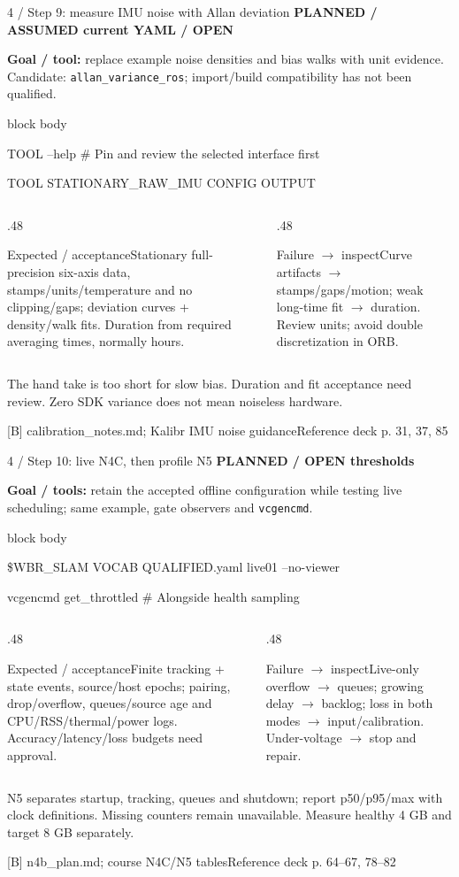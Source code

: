 \documentclass[aspectratio=169,12pt,t]{beamer}
\newcommand{\evidence}[1]{{\small\bfseries\color{teal!70!black}#1}\par\medskip}
\newcommand{\src}[2]{\vfill\par{\footnotesize\color{muted}#1\quad Reference deck p. #2}\par}
\newcommand{\code}[1]{\par\smallskip\begin{beamercolorbox}[wd=\linewidth,sep=2mm]{block body}{\ttfamily\small #1}\end{beamercolorbox}\par\smallskip}
\newcommand{\pair}[4]{\begin{columns}[T,onlytextwidth]\begin{column}{.48\textwidth}\begin{block}{#1}#2\end{block}\end{column}\begin{column}{.48\textwidth}\begin{block}{#3}#4\end{block}\end{column}\end{columns}}
\begin{document}
\begin{frame}{4 / Step 9: measure IMU noise with Allan deviation}
\evidence{PLANNED / ASSUMED current YAML / OPEN}

\textbf{Goal / tool:} replace example noise densities and bias walks with unit evidence. Candidate: \texttt{allan\_variance\_ros}; import/build compatibility has not been qualified.
\code{TOOL --help \quad\# Pin and review the selected interface first\par TOOL STATIONARY\_RAW\_IMU CONFIG OUTPUT}
\pair{Expected / acceptance}{Stationary full-precision six-axis data, stamps/units/temperature and no clipping/gaps; deviation curves + density/walk fits. Duration from required averaging times, normally hours.}{Failure $\to$ inspect}{Curve artifacts $\to$ stamps/gaps/motion; weak long-time fit $\to$ duration. Review units; avoid double discretization in ORB.}
\medskip The hand take is too short for slow bias. Duration and fit acceptance need review. Zero SDK variance does not mean noiseless hardware.

\src{[B] calibration\_notes.md; Kalibr IMU noise guidance}{31, 37, 85}
\end{frame}

\begin{frame}{4 / Step 10: live N4C, then profile N5}
\evidence{PLANNED / OPEN thresholds}

\textbf{Goal / tools:} retain the accepted offline configuration while testing live scheduling; same example, gate observers and \texttt{vcgencmd}.
\code{\$WBR\_SLAM VOCAB QUALIFIED.yaml live01 --no-viewer\par vcgencmd get\_throttled \quad\# Alongside health sampling}
\pair{Expected / acceptance}{Finite tracking + state events, source/host epochs; pairing, drop/overflow, queues/source age and CPU/RSS/thermal/power logs. Accuracy/latency/loss budgets need approval.}{Failure $\to$ inspect}{Live-only overflow $\to$ queues; growing delay $\to$ backlog; loss in both modes $\to$ input/calibration. Under-voltage $\to$ stop and repair.}
\medskip N5 separates startup, tracking, queues and shutdown; report p50/p95/max with clock definitions. Missing counters remain unavailable. Measure healthy 4 GB and target 8 GB separately.

\src{[B] n4b\_plan.md; course N4C/N5 tables}{64--67, 78--82}
\end{frame}
\end{document}
